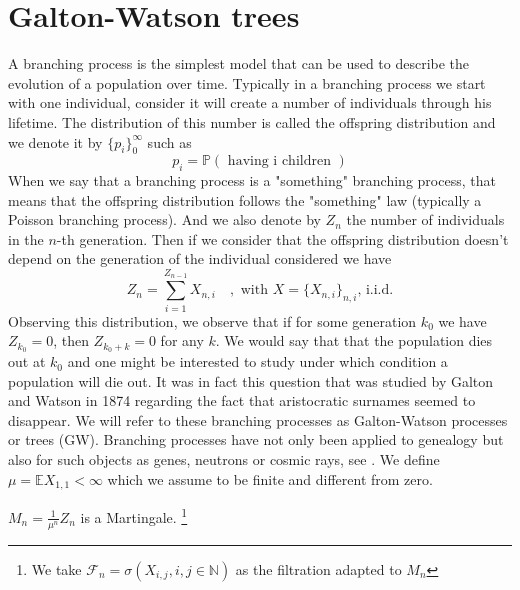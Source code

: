 \section{Galton-Watson trees}
A branching process is the simplest model that can be used to describe the evolution of a population over time.
Typically in a branching process we start with one individual, consider it will create a number of individuals through his lifetime. 
The distribution of this number is called the offspring distribution and we denote it by $\{p_i\}_0^{\infty}$ such as
\begin{equation}
	p_i = \mathbb{P}(\text{ having i children })
\end{equation}
When we say that a branching process is a "something" branching process, that means that the offspring distribution follows the "something" law (typically a Poisson branching process).
And we also denote by $Z_n$ the number of individuals in the $n$-th generation. 
Then if we consider that the offspring distribution doesn't depend on the generation of the individual considered we have
\begin{equation}
	Z_n = \sum_{i=1}^{Z_{n-1}}X_{n, i} \quad, \text{ with } X = \{X_{n,i}\}_{n,i} \text{,  i.i.d.}
\end{equation}
Observing this distribution, we observe that if for some generation $k_0$ we have $Z_{k_0} = 0$, then $Z_{k_0 + k} = 0$ for any $k$. We would say that that the population dies out at $k_0$ and one might be interested to study under which condition a population will die out.
It was in fact this question that was studied by Galton and Watson in 1874 regarding the fact that aristocratic surnames seemed to disappear.
We will refer to these branching processes as Galton-Watson processes or trees (GW).
Branching processes have not only been applied to genealogy but also for such objects as genes, neutrons or cosmic rays, see \cite{Harris64}.
\newline
We define $\mu = \mathbb{E} X_{1,1} < \infty$ which we assume to be finite and different from zero.
\begin{lemma}\label{martinGW}
	$M_n = \frac{1}{\mu^n}Z_n$ is a Martingale. 
	\footnote{We take $\mathcal{F}_n = \sigma(X_{i,j} , i,j \in \mathbb{N})$ as the filtration adapted to $M_n$ }
\end{lemma}
